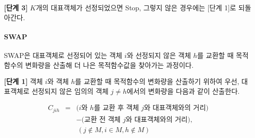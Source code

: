 \documentclass[]{book}
\newenvironment{Shaded}{\begin{snugshade}}{\end{snugshade}}
\newcommand{\CommentTok}[1]{\textcolor[rgb]{0.56,0.35,0.01}{\textit{#1}}}
\newcommand{\DataTypeTok}[1]{\textcolor[rgb]{0.13,0.29,0.53}{#1}}
\newcommand{\DecValTok}[1]{\textcolor[rgb]{0.00,0.00,0.81}{#1}}
\newcommand{\KeywordTok}[1]{\textcolor[rgb]{0.13,0.29,0.53}{\textbf{#1}}}
\newcommand{\NormalTok}[1]{#1}
\newcommand{\OperatorTok}[1]{\textcolor[rgb]{0.81,0.36,0.00}{\textbf{#1}}}
\newcommand{\StringTok}[1]{\textcolor[rgb]{0.31,0.60,0.02}{#1}}
\let\oldparagraph\paragraph
\renewcommand{\paragraph}[1]{\oldparagraph{#1}\mbox{}}
\begin{document}
\begin{Shaded}
\end{Shaded}

\textbf{{[}단계 3{]}} \(K\)개의 대표객체가 선정되었으면 Stop, 그렇지 않은 경우에는 {[}단계 1{]}로 되돌아간다.

\hypertarget{pam-swap}{%
\paragraph{SWAP}\label{pam-swap}}

SWAP은 대표객체로 선정되어 있는 객체 \(i\)와 선정되지 않은 객체 \(h\)를 교환할 때 목적함수의 변화량을 산출해 더 나은 목적함수값을 찾아가는 과정이다.

\textbf{{[}단계 1{]}} 객체 \(i\)와 객체 \(h\)를 교환할 때 목적함수의 변화량을 산출하기 위하여 우선, 대표객체로 선정되지 않은 임의의 객체 \(j \neq h\)에서의 변화량을 다음과 같이 산출한다.

\begin{eqnarray*}
C_{jih} &=& \text{($i$와 $h$를 교환 후 객체 $j$와 대표객체와의 거리)}\\
 & & - \text{(교환 전 객체 $j$와 대표객체와의 거리)},\\
 & & \, (j \notin M, i \in M, h \notin M)
\end{eqnarray*}

\begin{Shaded}
\end{Shaded}
\end{document}
